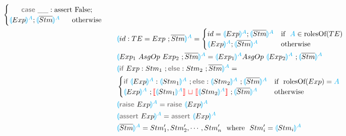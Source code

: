 \documentclass{thesis}
\newcommand{\projection}[2]{{\color{cyan}\llparenthesis}#1{\color{cyan}\rrparenthesis^#2}}
\newcommand{\gray}[1]{\textbf{\textsf{\color{Gray}#1}}}
\newcommand{\cyan}[1]{\color{cyan}#1}
\newcommand{\nl}[1]{{\color{red}{\llbracket}}#1{\color{red}{\rrbracket}}} %
\newcommand{\mg}{~{\color{red}{\sqcup}}~} %
\begin{document}
\begin{alignat*}{2}
\begin{cases}
    ~~~~~\gray{case} ~\_\_: \text{assert False}; \\
    \projection{Exp}{A};\projection{\overline{Stm}}{A} ~~~~~ \text{otherwise}\\
  \end{cases}\\
  &&& \projection{id:TE = Exp~;\overline{Stm}}{A} =
  \begin{cases}
    id = \projection{Exp}{A};\projection{\overline{Stm}}{A} & \text{if}~~ {\color{cyan}A} \in \text{rolesOf}(TE)\\
    \projection{Exp}{A};\projection{\overline{Stm}}{A} & \text{otherwise}
  \end{cases}\\
  &&& \projection{Exp_1 ~AsgOp~ Exp_2 ~; \overline{Stm}}{A} = \projection{Exp_1}{A} AsgOp~ \projection{Exp_2}{A} ~; \projection{\overline{Stm}}{A} \\
  &&&\projection{\gray{if}~Exp:Stm_1~;\gray{else}:Stm_2 ~;\overline{Stm}}{A}=\\
  &&&
  \begin{cases}
    \gray{if}~\projection{Exp}{A} : \projection{Stm_1}{A} ~; \gray{else}:\projection{Stm_2}{A} ~;\projection{\overline{Stm}}{A} & \text{if}~~ \text{rolesOf}(Exp) = \cyan{A}\\
    \projection{Exp}{A} ~; \nl{\projection{Stm_1}{A}} \mg \nl{\projection{Stm_2}{A}} ~;\projection{\overline{Stm}}{A} & \text{otherwise}
  \end{cases}\\
  &&&\projection{\gray{raise}~Exp}{A} = \gray{raise}~\projection{Exp}{A}\\
  &&&\projection{\gray{assert}~Exp}{A} = \gray{assert}~\projection{Exp}{A}\\
  &&&\projection{\overline{Stm}}{A} = Stm'_1,Stm'_2,\cdots,Stm'_n ~~\text{where}~~ Stm'_i = \projection{Stm_i}{A}\\  
\end{alignat*}
\end{document}
